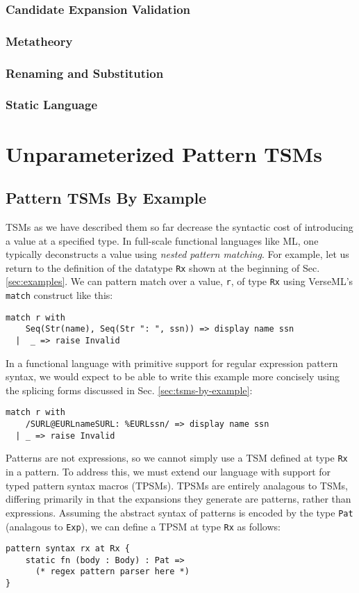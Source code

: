 \subsection{Candidate Expansion Validation}
\subsection{Metatheory}
\subsection{Renaming and Substitution}
\subsection{Static Language}\label{sec:static-subset}
\chapter{Unparameterized Pattern TSMs}\label{sec:pattern-tsms}
\section{Pattern TSMs By Example}
TSMs as we have described them so far decrease the syntactic cost of introducing a value at a specified type. In full-scale functional languages like ML, one typically deconstructs a value using \emph{nested pattern matching}. For example, let us return to the definition of the datatype \lstinline{Rx} shown at the beginning of Sec. \ref{sec:examples}. We can pattern match over a value, \lstinline{r}, of type \lstinline{Rx} using VerseML's \lstinline{match} construct like this:
\begin{lstlisting}[numbers=none]
match r with 
    Seq(Str(name), Seq(Str ": ", ssn)) => display name ssn
  |  _ => raise Invalid
\end{lstlisting}
In a functional language with primitive support for regular expression pattern syntax, we would expect to be able to write this example more concisely using the splicing forms discussed in Sec. \ref{sec:tsms-by-example}:
\begin{lstlisting}[numbers=none]
match r with 
    /SURL@EURLnameSURL: %EURLssn/ => display name ssn
  | _ => raise Invalid
\end{lstlisting}

Patterns are not expressions, so we cannot simply use a TSM defined at type \lstinline{Rx} in a pattern. To address this, we must extend our language with support for typed pattern syntax macros (TPSMs). TPSMs are entirely analagous to TSMs, differing primarily in that the expansions they generate are patterns, rather than expressions. Assuming the abstract syntax of patterns is encoded by the type \lstinline{Pat} (analagous to \lstinline{Exp}), we can define a TPSM at type \lstinline{Rx} as follows:
\begin{lstlisting}[numbers=none]
pattern syntax rx at Rx {
	static fn (body : Body) : Pat => 
	  (* regex pattern parser here *)
}
\end{lstlisting}

